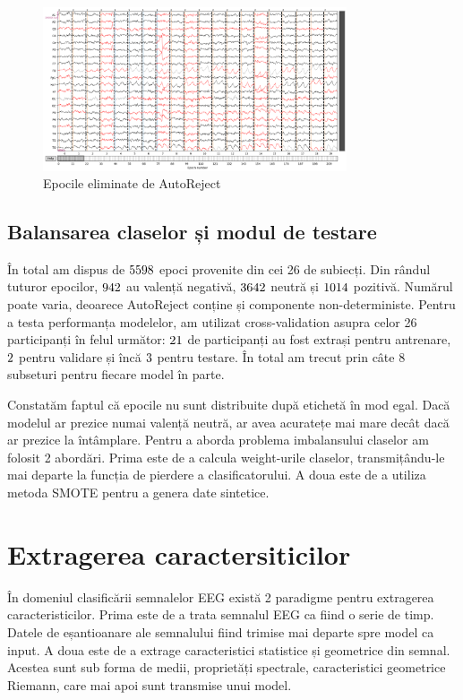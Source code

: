 \vspace{1em}
\begin{figure}[h]
    \centering
    \includegraphics[width=0.8\textwidth]{images/rezultat_autoreject.png}
    \caption{Epocile eliminate de AutoReject}
    \label{fig:autoreject}
\end{figure}

\subsection{Balansarea claselor și modul de testare}

În total am dispus de $5598$ epoci provenite din cei 26 de subiecți. Din rândul tuturor epocilor, $942$ au valență negativă, $3642$ neutră și $1014$ pozitivă. Numărul poate varia, deoarece AutoReject conține și componente non-deterministe. Pentru a testa performanța modelelor, am utilizat cross-validation asupra celor 26 participanți în felul următor: $21$ de participanți au fost extrași pentru antrenare, $2$ pentru validare și încă $3$ pentru testare. În total am trecut prin câte 8 subseturi pentru fiecare model în parte.

Constatăm faptul că epocile nu sunt distribuite după etichetă în mod egal. Dacă modelul ar prezice numai valență neutră, ar avea acuratețe mai mare decât dacă ar prezice la întâmplare. Pentru a aborda problema imbalansului claselor am folosit 2 abordări. Prima este de a calcula weight-urile claselor, transmițându-le mai departe la funcția de pierdere a clasificatorului. A doua este de a utiliza metoda SMOTE\cite{imblearn} pentru a genera date sintetice.

\section{Extragerea caractersiticilor}
În domeniul clasificării semnalelor EEG există 2 paradigme pentru extragerea caracteristicilor. Prima este de a trata semnalul EEG ca fiind o serie de timp. Datele de eșantioanare ale semnalului fiind trimise mai departe spre model ca input. A doua este de a extrage caracteristici statistice și geometrice din semnal. Acestea sunt sub forma de medii, proprietăți spectrale, caracteristici geometrice Riemann, care mai apoi sunt transmise unui model.

